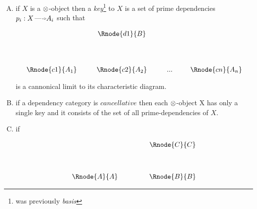 \documentclass[10pt,a4paper]{scrartcl}
\begin{document}
\begin{enumerate} [A.,leftmargin=0.5cm]
\item 
if $X$ is a $\otimes$-object then a \textit{key}\footnote{was previously \textit{basis}} to $X$ is a set of prime dependencies $p_i: X \dmorph A_i$ 
such that 
\begin{center}
\begin{displaymath}
\begin{array}{cp{0.3cm}c         p{0.3cm}  c p{0.2cm} c}
               & & \Rnode{d1}{B} & &     & &  \\ [1.4cm]
\Rnode{c1}{A_1}& &\Rnode{c2}{A_2}& & ... & &\Rnode{cn}{A_n}
\end{array}
\end{displaymath}
\end{center}

is a cannonical limit to its characteristic diagram.
\item
if a dependency category  is $cancellative$ then each $\otimes$-object X has only a single key and it consists 
of the set of all prime-dependencies of $X$.

	\item  
	if
\begin{center}
\begin{displaymath}
\begin{array}{cp{.9cm}c}
            & & \Rnode{C}{C} \\ [1.2cm]
\Rnode{A}{A}& & \Rnode{B}{B} \\
\end{array}
\end{displaymath}
\end{center}


\end{enumerate}
\end{document}
